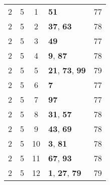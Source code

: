 \documentclass{article}
\begin{document}
\begin{minipage}[t]{0.5\textwidth}
\begin{flushleft}
\begin{tabular}{||c|c|c|l|c||}
	2&5&1&\textbf{51}&77\\
	2&5&2&\textbf{37}, \textbf{63}&78\\
	2&5&3&\textbf{49}&77\\
	2&5&4&\textbf{9}, \textbf{87}&78\\
	2&5&5&\textbf{21}, \textbf{73}, \textbf{99}&79\\
	2&5&6&\textbf{7}&77\\
	2&5&7&\textbf{97}&77\\
	2&5&8&\textbf{31}, \textbf{57}&78\\
	2&5&9&\textbf{43}, \textbf{69}&78\\
	2&5&10&\textbf{3}, \textbf{81}&78\\
	2&5&11&\textbf{67}, \textbf{93}&78\\
	2&5&12&\textbf{1}, \textbf{27}, \textbf{79}&79\\
\end{tabular}
\end{flushleft}
\end{minipage}
\end{document}
